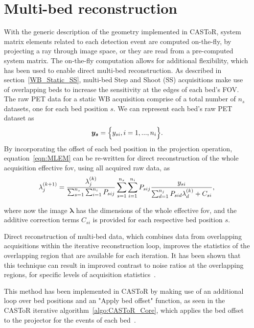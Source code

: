 \section{Multi-bed reconstruction}
\label{chap2_4:MultiBedRecon}
With the generic description of the geometry implemented in CASToR, system matrix elements related to each detection event are computed on-the-fly, by projecting a ray through image space, or they are read from a pre-computed system matrix. 
The on-the-fly computation allows for additional flexibility, which has been used to enable direct multi-bed reconstruction. 
As described in section~\ref{WB_Static_SS}, multi-bed Step and Shoot (SS) acquisitions make use of overlapping beds to increase the sensitivity at the edges of each bed's FOV. The raw PET data for a static WB acquisition comprise of a total number of $n_s$ datasets, one for each bed position $s$. We can represent each bed's raw PET dataset as
%
\begin{equation}
   \bm{y_s} = \Big\{ {y_{si},i=1,...,n_i} \Big\} \\ . \\
\end{equation}
%
%
By incorporating the offset of each bed position in the projection operation, equation~\ref{eqn:MLEM} can be re-written for direct reconstruction of the whole acquisition effective \gls{fov}, using all acquired raw data, as
\begin{equation}
\lambda_j^{(k+1)} = \frac{\lambda_j^{(k)}}{\sum_{s=1}^{n_s} \sum_{i=1}^{n_i} P_{sij}} 
\sum_{s=1}^{n_s} \sum_{i=1}^{n_i} P_{sij} 
\frac{y_{si}}{\sum_{d=1}^{n_j} P_{sid}\lambda_d^{(k)} + C_{si} } \\ , \\
\label{eqn2_4:MLEM_multibed}
\end{equation} 

where now the image $\bm{\lambda}$ has the dimensions of the whole effective \gls{fov}, and the additive correction terms $C_{si}$ is provided for each respective bed position $s$. 

Direct reconstruction of multi-bed data, which combines data from overlapping acquisitions within the iterative reconstruction loop, improves the statistics of the overlapping region that are available for each iteration. It has been shown that this technique can result in improved contrast to noise ratios at the overlapping regions, for specific levels of acquisition statistics~\cite{Ross2004}. 

This method has been implemented in CASToR by making use of an additional loop over bed positions and an "Apply bed offset" function, as seen in the CASToR iterative algorithm~\ref{algo:CASToR_Core}, which applies the bed offset to the projector for the events of each bed~\cite{Stute2014}.
